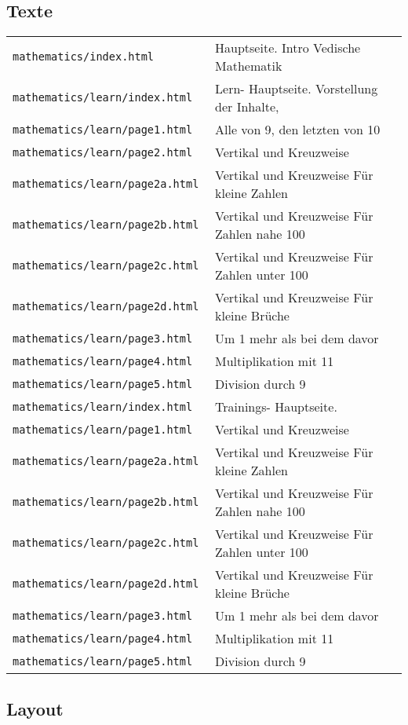 \subsection{Texte}
\begin{tabular}{ | l | l | } 
  \texttt{mathematics/index.html        } & Hauptseite. Intro Vedische Mathematik \\
  \texttt{mathematics/learn/index.html  } & Lern- Hauptseite. Vorstellung der Inhalte, \\
  \texttt{mathematics/learn/page1.html  } & Alle von 9, den letzten von 10 \\
  \texttt{mathematics/learn/page2.html  } & Vertikal und Kreuzweise \\
  \texttt{mathematics/learn/page2a.html } & Vertikal und Kreuzweise Für kleine Zahlen \\
  \texttt{mathematics/learn/page2b.html } & Vertikal und Kreuzweise Für Zahlen nahe 100 \\
  \texttt{mathematics/learn/page2c.html } & Vertikal und Kreuzweise Für Zahlen unter 100 \\
  \texttt{mathematics/learn/page2d.html } & Vertikal und Kreuzweise Für kleine Brüche \\
  \texttt{mathematics/learn/page3.html  } & Um 1 mehr als bei dem davor \\
  \texttt{mathematics/learn/page4.html  } & Multiplikation mit 11 \\
  \texttt{mathematics/learn/page5.html  } & Division durch 9 \\
  \texttt{mathematics/learn/index.html  } & Trainings- Hauptseite. \\
  \texttt{mathematics/learn/page1.html  } & Vertikal und Kreuzweise \\
  \texttt{mathematics/learn/page2a.html } & Vertikal und Kreuzweise Für kleine Zahlen \\
  \texttt{mathematics/learn/page2b.html } & Vertikal und Kreuzweise Für Zahlen nahe 100 \\
  \texttt{mathematics/learn/page2c.html } & Vertikal und Kreuzweise Für Zahlen unter 100 \\
  \texttt{mathematics/learn/page2d.html } & Vertikal und Kreuzweise Für kleine Brüche \\
  \texttt{mathematics/learn/page3.html  } & Um 1 mehr als bei dem davor \\
  \texttt{mathematics/learn/page4.html  } & Multiplikation mit 11 \\
  \texttt{mathematics/learn/page5.html  } & Division durch 9 \\
\end{tabular}

\subsection{Layout}
